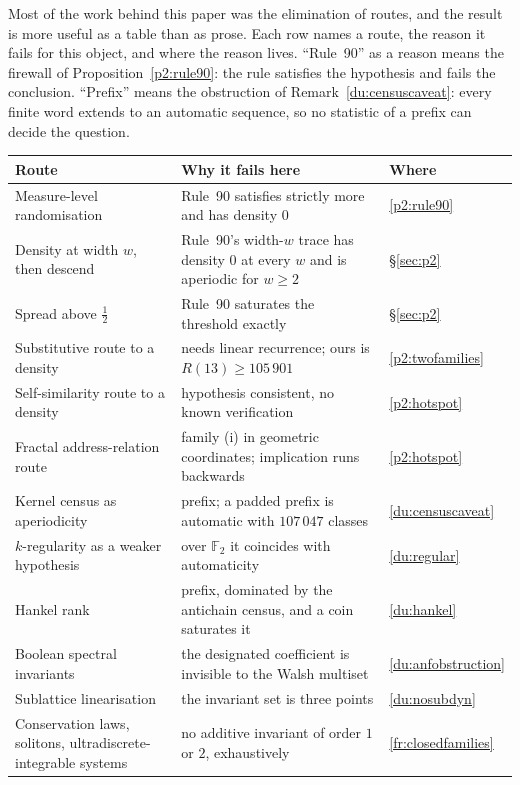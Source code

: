 \documentclass[11pt]{article}
\theoremstyle{definition}
\theoremstyle{remark}
\newcommand{\F}{\mathbb{F}_2}
\begin{document}
Most of the work behind this paper was the elimination of routes, and the result is more useful as a
table than as prose. Each row names a route, the reason it fails for this object, and where the reason
lives. ``Rule~90'' as a reason means the firewall of Proposition~\ref{p2:rule90}: the rule satisfies
the hypothesis and fails the conclusion. ``Prefix'' means the obstruction of
Remark~\ref{du:censuscaveat}: every finite word extends to an automatic sequence, so no statistic of a
prefix can decide the question.

\medskip
\noindent\begin{tabular}{@{}p{}p{}l@{}}
\hline
\textbf{Route} & \textbf{Why it fails here} & \textbf{Where} \\
\hline
Measure-level randomisation & Rule~90 satisfies strictly more and has density $0$ & \ref{p2:rule90}\\
Density at width $w$, then descend & Rule~90's width-$w$ trace has density $0$ at every $w$ and is aperiodic for $w\ge2$ & \S\ref{sec:p2}\\
Spread above $\tfrac12$ & Rule~90 saturates the threshold exactly & \S\ref{sec:p2}\\
Substitutive route to a density & needs linear recurrence; ours is $R(13)\ge105\,901$ & \ref{p2:twofamilies}\\
Self-similarity route to a density & hypothesis consistent, no known verification & \ref{p2:hotspot}\\
Fractal address-relation route & family (i) in geometric coordinates; implication runs backwards & \ref{p2:hotspot}\\
Kernel census as aperiodicity & prefix; a padded prefix is automatic with $107\,047$ classes & \ref{du:censuscaveat}\\
$k$-regularity as a weaker hypothesis & over $\F$ it coincides with automaticity & \ref{du:regular}\\
Hankel rank & prefix, dominated by the antichain census, and a coin saturates it & \ref{du:hankel}\\
Boolean spectral invariants & the designated coefficient is invisible to the Walsh multiset & \ref{du:anfobstruction}\\
Sublattice linearisation & the invariant set is three points & \ref{du:nosubdyn}\\
Conservation laws, solitons, ultradiscrete-integrable systems & no additive invariant of order $1$ or $2$, exhaustively & \ref{fr:closedfamilies}\\

\end{tabular}
\end{document}
